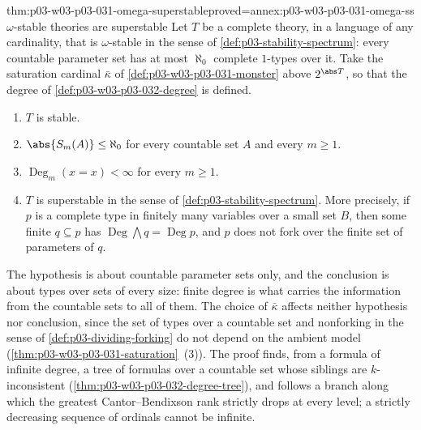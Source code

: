 \begin{hbtheorem}{thm:p03-w03-p03-031-omega-superstable}{proved=annex:p03-w03-p03-031-omega-ss}{\(\omega\)-stable theories are superstable}
Let \(T\) be a complete theory, in a language of any cardinality, that is
\(\omega\)-stable in the sense of \cref{def:p03-stability-spectrum}: every
countable parameter set has at most \(\aleph_0\) complete \(1\)-types over
it.  Take the saturation cardinal \(\bar\kappa\) of
\cref{def:p03-w03-p03-031-monster} above \(2^{\abs T}\), so that the
degree of \cref{def:p03-w03-p03-032-degree} is defined.
\begin{enumerate}
  \item \(T\) is stable.
  \item \(\abs{S_m(A)}\leq\aleph_0\) for every countable set \(A\) and every
        \(m\geq1\).
  \item \(\operatorname{Deg}_m(x=x)<\infty\) for every \(m\geq1\).
  \item \(T\) is superstable in the sense of
        \cref{def:p03-stability-spectrum}.  More precisely, if \(p\) is a
        complete type in finitely many variables over a small set \(B\),
        then some finite \(q\subseteq p\) has
        \(\operatorname{Deg}\bigwedge q=\operatorname{Deg}p\), and \(p\)
        does not fork over the finite set of parameters of \(q\).
\end{enumerate}
\end{hbtheorem}

The hypothesis is about countable parameter sets only, and the conclusion
is about types over sets of every size: finite degree is what carries the
information from the countable sets to all of them.  The choice of
\(\bar\kappa\) affects neither hypothesis nor conclusion, since the set of
types over a countable set and nonforking in the sense of
\cref{def:p03-dividing-forking} do not depend on the ambient model
(\cref{thm:p03-w03-p03-031-saturation}~(3)).  The proof finds, from a
formula of infinite degree, a tree of formulas over a countable set whose
siblings are \(k\)-inconsistent (\cref{thm:p03-w03-p03-032-degree-tree}),
and follows a branch along which the greatest Cantor--Bendixson rank
strictly drops at every level; a strictly decreasing sequence of ordinals
cannot be infinite.

